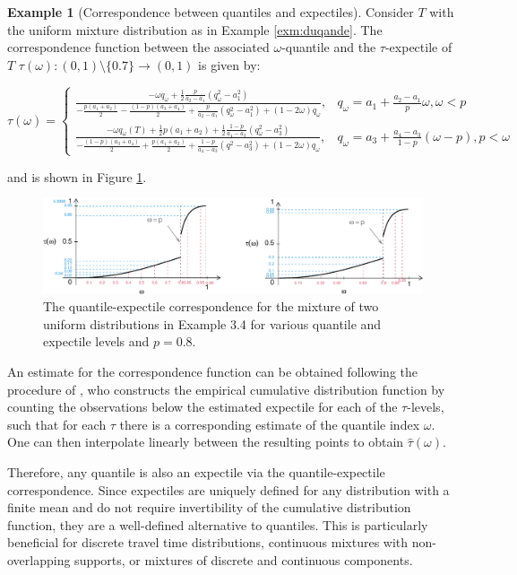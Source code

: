 \documentclass[preprint, 3p, authoryear]{elsarticle} %
\theoremstyle{definition}
\theoremstyle{definition}
\newtheorem{example}{Example}[section]
\theoremstyle{definition}
\theoremstyle{definition}
\theoremstyle{remark}
\begin{document}
\begin{example}[Correspondence between quantiles and expectiles]
\protect\hypertarget{exm:corrqe}{}\label{exm:corrqe}Consider \(T\) with the uniform mixture distribution as in Example \ref{exm:duqande}. The correspondence function between the associated \(\omega\)-quantile and the \(\tau\)-expectile of \(T\) \(\tau(\omega):(0,1)\setminus\{0.7\}\rightarrow(0,1)\) is given by:

\[\tau(\omega)=\begin{cases}
\frac{-\omega q_\omega+ \frac 12 \frac p{a_2-a_1}(q_\omega^2-a_1^2)}{-\frac{p(a_1+a_2)}{2}-\frac{(1-p)(a_3+a_4)}{2} +\frac p{a_2-a_1}(q_\omega^2-a_1^2) + (1-2\omega)q_\omega},&q_\omega= a_1 + \frac{a_2-a_1} p\omega, \omega <p\\
\frac{-\omega q_\omega(T) + \frac 12 p(a_1+a_2) + \frac 12 \frac {1-p}{a_4-a_3}(q_\omega^2-a_3^2)}{-\frac{(1-p)(a_3+a_4)}{2} + \frac{p(a_1+a_2)}2 + \frac {1-p}{a_4-a_3}(q^2-a_3^2) + (1-2\omega)q_\omega},&q_\omega = a_3 + \frac{a_4-a_3}{1-p}(\omega-p), p<\omega
\end{cases}\]

and is shown in Figure \ref{fig:figcor}.
\end{example}

\begin{figure}
\includegraphics[width=0.8\linewidth]{traffic-expectiles_files/figure-latex/figcor-1} \caption{The quantile-expectile correspondence for the mixture of two uniform distributions in Example 3.4 for various quantile and expectile levels and $p=0.8$.}\label{fig:figcor}
\end{figure}

An estimate for the correspondence function can be obtained following the procedure of \citet{taylor2008}, who constructs the empirical cumulative distribution function by counting the observations below the estimated expectile for each of the \(\tau\)-levels, such that for each \(\tau\) there is a corresponding estimate of the quantile index \(\omega\). One can then interpolate linearly between the resulting points to obtain \(\hat\tau(\omega)\).

Therefore, any quantile is also an expectile via the quantile-expectile correspondence. Since expectiles are uniquely defined for any distribution with a finite mean and do not require invertibility of the cumulative distribution function, they are a well-defined alternative to quantiles. This is particularly beneficial for discrete travel time distributions, continuous mixtures with non-overlapping supports, or mixtures of discrete and continuous components.
\end{document}
